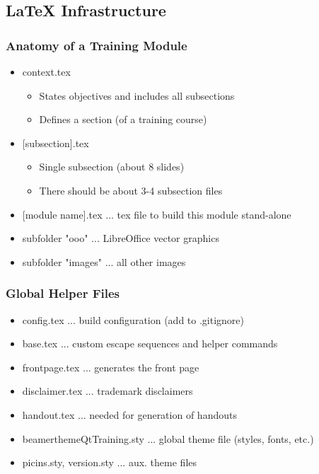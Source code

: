 \subsection{LaTeX Infrastructure}

\begin{slide}
  \frametitle{Anatomy of a Training Module}
  \begin{itemize}
    \item context.tex
    \begin{itemize}
      \item States objectives and includes all subsections
      \item Defines a section (of a training course)
    \end{itemize}
    \item{} [subsection].tex
    \begin{itemize}
      \item Single subsection (about 8 slides)
      \item There should be about 3-4 subsection files
    \end{itemize}
    \item{} [module name].tex ... tex file to build this module stand-alone
    \item subfolder "ooo" ... LibreOffice vector graphics
    \item subfolder "images" ... all other images
  \end{itemize}
\end{slide}

\begin{slide}
  \frametitle{Global Helper Files}
  \begin{itemize}
    \item config.tex ... build configuration (add to .gitignore)
    \item base.tex ... custom escape sequences and helper commands
    \item frontpage.tex ... generates the front page
    \item disclaimer.tex ... trademark disclaimers
    \item handout.tex ... needed for generation of handouts
    \item beamerthemeQtTraining.sty ... global theme file (styles, fonts, etc.)
    \item picins.sty, version.sty ... aux. theme files
  \end{itemize}
\end{slide}
